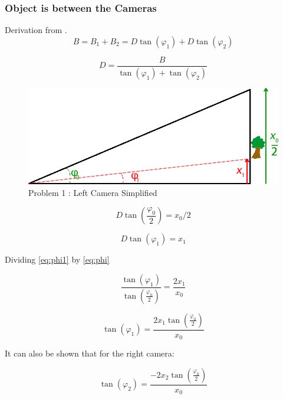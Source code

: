 \subsubsection{Object is between the Cameras}
Derivation from \cite{Mrovlje:Distance_Stereoscopic}.
\begin{equation} \label{eq:B}
B = B_{1} + B_{2} = D\tan(\varphi_{1}) + D\tan(\varphi_{2})
\end{equation}

\begin{equation} \label{eq:D}
D = \frac{B}{\tan(\varphi_{1}) + \tan(\varphi_{2})}
\end{equation}


\begin{figure}
\includegraphics[width=\textwidth,height=\textheight,keepaspectratio]{Figures/left_simplified.png}
\caption{Problem 1 : Left Camera Simplified}
\label{Left_Simplified}
\end{figure}

\begin{equation} \label{eq:phi}
D\tan(\frac{\varphi_{0}}{2}) = x_{0} / 2
\end{equation}

\begin{equation} \label{eq:phi1}
D\tan(\varphi_1) = x_1
\end{equation}

Dividing \eqref{eq:phi1} by \eqref{eq:phi}

\begin{equation} \label{eq:tanovertan}
\frac{\tan(\varphi_1)}{\tan(\frac{\varphi_0}{2})} = \frac{2x_1}{x_0}
\end{equation}

\begin{equation} \label{eq:phionesolved}
\tan(\varphi_1) = \frac{2x_1\tan(\frac{\varphi_0}{2})}{x_0}
\end{equation}

It can also be shown that for the right camera:

\begin{equation} \label{eq:phitwosolved}
\tan(\varphi_2) = \frac{-2x_2\tan(\frac{\varphi_0}{2})}{x_0}
\end{equation}

